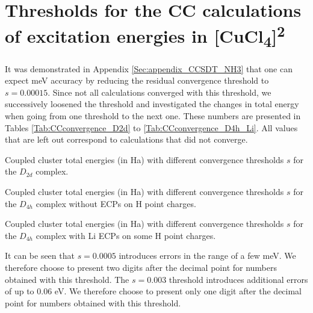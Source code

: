 \section{Thresholds for the CC calculations of excitation energies in [CuCl\textsubscript{4}]\textsuperscript{2\textminus}}
\label{Sec:appendix_thresholdsCC}
It was demonstrated in Appendix \ref{Sec:appendix_CCSDT_NH3} that one can expect meV accuracy by reducing the residual convergence threshold to $s=0.00015$. Since not all calculations converged with this threshold, we successively loosened the threshold and investigated the changes in total energy when going from one threshold to the next one. These numbers are presented in Tables \ref{Tab:CCconvergence_D2d} to \ref{Tab:CCconvergence_D4h_Li}. All values that are left out correspond to calculations that did not converge.

\begin{table}
\small
\centering
\ttabbox
{\caption[Coupled cluster total energies with different convergence thresholds for the $D_{2d}$ complex.]{Coupled cluster total energies (in Ha) with different convergence thresholds $s$ for the $D_{2d}$ complex.}
\label{Tab:CCconvergence_D2d}}
{
}
\end{table} 
  	
\begin{table}
\small
\centering
\ttabbox
{\caption[Coupled cluster total energies with different convergence thresholds for the $D_{4h}$ complex without ECPs on H point charges.]{Coupled cluster total energies (in Ha) with different convergence thresholds $s$ for the $D_{4h}$ complex without ECPs on H point charges.}
\label{Tab:CCconvergence_D4h_Hatom}}
{
}
\end{table}

\begin{table}
\small
\centering
\ttabbox
{\caption[Coupled cluster total energies with different convergence thresholds for the $D_{4h}$ complex with Li ECPs on some H point charges.]{Coupled cluster total energies (in Ha) with different convergence thresholds $s$ for the $D_{4h}$ complex with Li ECPs on some H point charges.}
\label{Tab:CCconvergence_D4h_Li}}
{
}
\end{table}

It can be seen that $s=0.0005$ introduces errors in the range of a few meV. We therefore choose to present two digits after the decimal point for numbers obtained with this threshold. The $s=0.003$ threshold introduces additional errors of up to 0.06 eV. We therefore choose to present only one digit after the decimal point for numbers obtained with this threshold.

